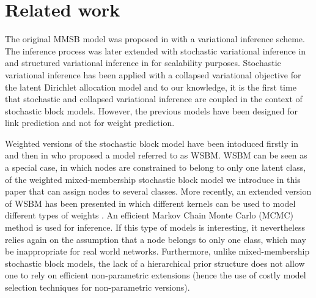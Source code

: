 \section{Related work}
\label{sec:rl}




The original MMSB model was proposed in \cite{airoldi2009mixed} with a variational inference scheme. The inference process was later extended with stochastic variational inference in \cite{gopalan2013efficient} and structured variational inference in \cite{kim2013efficient} for scalability purposes. Stochastic variational inference has been applied with a collapsed variational objective for the latent Dirichlet allocation model \cite{foulds2013stochastic} and to our knowledge, it is the first time that stochastic and collapsed variational inference are coupled in the context of stochastic block models. However, the previous models have been designed for link prediction and not for weight prediction.  

Weighted versions of the stochastic block model have been intoduced firstly in \cite{mariadassou2010} and then in \cite{aicher2014learning} who proposed a model referred to as WSBM. WSBM can be seen as a special case, in which nodes are constrained to belong to only one latent class, of the weighted mixed-membership stochastic block model we introduce in this paper that can assign nodes to several classes. More recently, an extended version of WSBM has been presented in which different kernels can be used to model different types of weights \cite{peixoto2018nonparametric}. An efficient Markov Chain Monte Carlo (MCMC) method is used for inference. If this type of models is interesting, it nevertheless relies again on the assumption that a node belongs to only one class, which may be inappropriate for real world networks. Furthermore, unlike mixed-membership stochastic block models, the lack of a hierarchical prior structure does not allow one to rely on efficient non-parametric extensions (hence the use of costly model selection techniques for non-parametric versions). 

